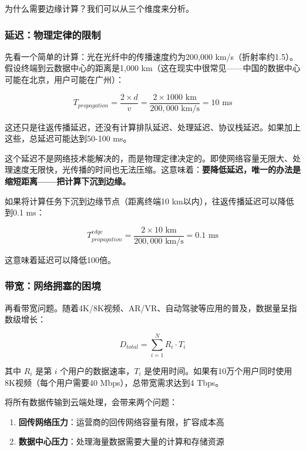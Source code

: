为什么需要边缘计算？我们可以从三个维度来分析。

\subsubsection{延迟：物理定律的限制}

先看一个简单的计算：光在光纤中的传播速度约为200,000 km/s（折射率约1.5）。假设终端到云数据中心的距离是1,000 km（这在现实中很常见——中国的数据中心可能在北京，用户可能在广州）：

\begin{equation}
T_{propagation} = \frac{2 \times d}{v} = \frac{2 \times 1000 \text{ km}}{200,000 \text{ km/s}} = 10 \text{ ms}
\end{equation}

这还只是往返传播延迟，还没有计算排队延迟、处理延迟、协议栈延迟。如果加上这些，总延迟可能达到50-100 ms。

\begin{insightbox}[延迟的物理限制]
这个延迟不是网络技术能解决的，而是物理定律决定的。即使网络容量无限大、处理速度无限快，光传播的时间也无法压缩。这意味着：\textbf{要降低延迟，唯一的办法是缩短距离——把计算下沉到边缘。}
\end{insightbox}

如果将计算任务下沉到边缘节点（距离终端10 km以内），往返传播延迟可以降低到0.1 ms：

\begin{equation}
T_{propagation}^{edge} = \frac{2 \times 10 \text{ km}}{200,000 \text{ km/s}} = 0.1 \text{ ms}
\end{equation}

这意味着延迟可以降低100倍。

\subsubsection{带宽：网络拥塞的困境}

再看带宽问题。随着4K/8K视频、AR/VR、自动驾驶等应用的普及，数据量呈指数级增长：

\begin{equation}
D_{total} = \sum_{i=1}^{N} R_i \cdot T_i
\end{equation}

其中 $R_i$ 是第 $i$ 个用户的数据速率，$T_i$ 是使用时间。如果有10万个用户同时使用8K视频（每个用户需要40 Mbps），总带宽需求达到4 Tbps。

将所有数据传输到云端处理，会带来两个问题：
\begin{enumerate}
    \item \textbf{回传网络压力}：运营商的回传网络容量有限，扩容成本高
    \item \textbf{数据中心压力}：处理海量数据需要大量的计算和存储资源
\end{enumerate}

